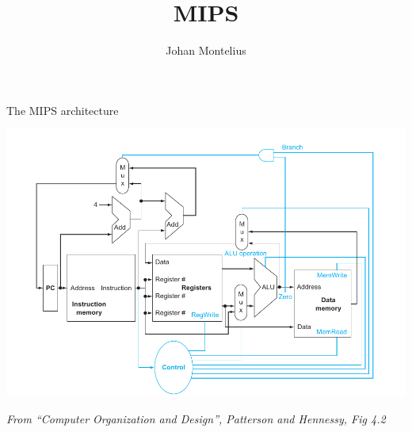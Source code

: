 

\usetikzlibrary{shapes.misc}


\title[ID1019 MIPS]{MIPS}

\author{Johan Montelius}
\date{\semester}



\begin{frame}
\titlepage
\end{frame}

\begin{frame}{The MIPS architecture}
 
\includegraphics[scale=0.4]{mips.png}  

{\em From ``Computer Organization and Design'', Patterson and Hennessy, Fig 4.2}
\end{frame}

